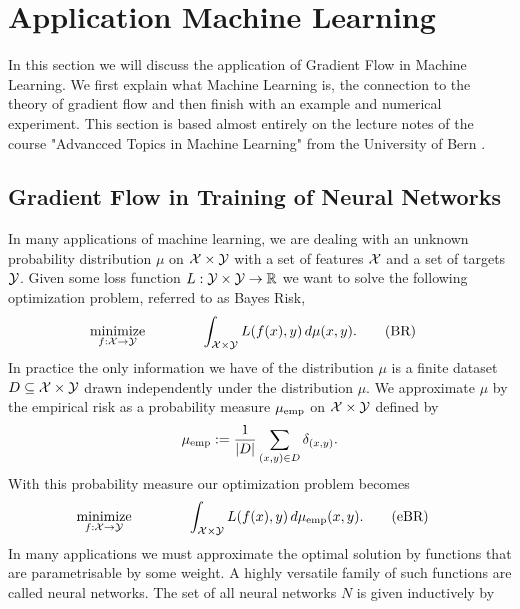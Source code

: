 \section{Application Machine Learning}

In this section we will discuss the application of Gradient Flow
in Machine Learning. We first explain what Machine Learning
is, the connection to the theory of gradient flow
and then finish with an example and numerical experiment.
This section is based almost entirely on the lecture
notes of the course "Advancced Topics in Machine Learning"
from the University of Bern \cite{uniBernLecNotes}.

\subsection{Gradient Flow in Training of Neural Networks}
In many applications of machine learning, we are dealing
with an unknown probability distribution $ \mu $ on
$ \mathcal{X}\times \mathcal{Y}$ with a set of features $ \mathcal{X} $
and a set of targets $ \mathcal{Y} $. Given some 
loss function $ L:\mathcal{Y}\times \mathcal{Y}\rightarrow\mathbb{R} $
we want to solve the following optimization problem,
referred to as Bayes Risk,
\begin{align}\label{equation:Bayes Risk}
	\operatorname*{\mathrm{minimize}}_{f:\mathcal{X}\rightarrow\mathcal{Y}}
	\qquad &\qquad
	\int_{\mathcal{X}\times \mathcal{Y}} L(f(x),y)\,d\mu(x,y).
	\tag{BR}
\end{align}
In practice the only information we
have of the distribution $ \mu $
is a finite dataset $ D\subseteq\mathcal{X}\times\mathcal{Y} $
drawn independently under the distribution $ \mu $. 
We approximate $ \mu $ by the empirical risk as a 
probability measure $ \mu_{\mathrm{emp}} $ on $ \mathcal{X}\times\mathcal{Y} $ defined by
\begin{align*}
	\mu_{\mathrm{emp}}:=\frac{1}{\vert D\vert}\sum_{(x,y)\in D}\delta_{(x,y)}.
\end{align*}
With this probability measure our optimization problem becomes
\begin{align}\label{equation:emp Bayes Risk}
	\operatorname*{\mathrm{minimize}}_{f:\mathcal{X}\rightarrow\mathcal{Y}}
	\qquad &\qquad
	\int_{\mathcal{X}\times \mathcal{Y}} L(f(x),y)\,d\mu_{\mathrm{emp}}(x,y).
	\tag{eBR}
\end{align}
In many applications we must approximate the optimal solution 
by functions that are parametrisable by some weight.
A highly versatile family of such functions are called
neural networks. The set of all neural networks $ N $ is given inductively by
